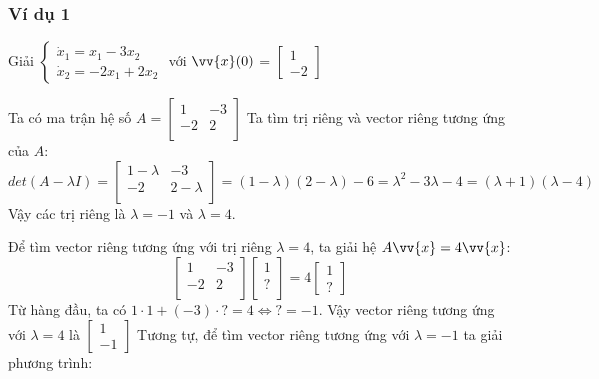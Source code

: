\documentclass[a4paper]{article}
\begin{document}
\subsubsection{Ví dụ 1}
Giải
$\begin{cases}
    \dot{x}_1 = x_1 - 3x_2 \\
    \dot{x}_2 = -2x_1 + 2x_2 
\end{cases}$ với 
$\vv{x}(0)$ = 
$
\begin{bmatrix}
    1 \\
    -2
\end{bmatrix}
$
\par
Ta có ma trận hệ số  
$ A = 
\begin{bmatrix}
1  & -3 \\
-2 & 2 \\
\end{bmatrix}
$
Ta tìm trị riêng và vector riêng tương ứng của $A$:
\[
    det(A - \lambda I) = 
    \begin{bmatrix}
        1 - \lambda & -3          \\
        -2          & 2 - \lambda \\
    \end{bmatrix}
    = (1 - \lambda)(2 - \lambda) - 6 = \lambda^2 - 3\lambda - 4 = (\lambda + 1)(\lambda - 4)
\]
Vậy các trị riêng là $\lambda = -1$ và $\lambda = 4$. \par
Để tìm vector riêng tương ứng với trị riêng $\lambda = 4$, ta giải hệ $A\vv{x} = 4\vv{x}$:
\begin{equation*}
    \begin{bmatrix}
        1  & -3 \\
        -2 & 2 \\
    \end{bmatrix}
    \begin{bmatrix}
        1 \\ 
        ? \\ 
    \end{bmatrix}
    = 4
    \begin{bmatrix}
        1 \\
        ? 
    \end{bmatrix}
\end{equation*}
Từ hàng đầu, ta có $ 1\cdot1 + (-3) \cdot ? = 4 \iff ? = -1$. Vậy vector riêng tương ứng với $\lambda = 4$ là 
$
\begin{bmatrix}
    1 \\ -1
\end{bmatrix}
$
Tương tự, để tìm vector riêng tương ứng với $\lambda = -1$ ta giải phương trình:
\end{document}
